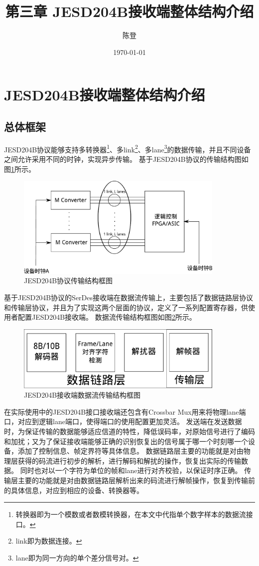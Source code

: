 \documentclass[UTF8]{ctexart}
\title{第三章 JESD204B接收端整体结构介绍}
\author{陈登}
\date{\today}
\begin{document}
\section{JESD204B接收端整体结构介绍}

\subsection{总体框架}

JESD204B协议能够支持多转换器\footnote{转换器即为一个模数或者数模转换器，在本文中代指单个数字样本的数据流接口。}、多link\footnote{link即为数据连接。}、多lane\footnote{lane即为同一方向的单个差分信号对。}的数据传输，并且不同设备之间允许采用不同的时钟，实现异步传输。
基于JESD204B协议的传输结构图如图\ref{fig:jesd204b_stuct}所示。

\begin{figure}[H]
\centering
\includegraphics[width=10cm]{./img/jesd204b_stuct.pdf}
\caption{JESD204B协议传输结构框图}
\label{fig:jesd204b_stuct}
\end{figure}

基于JESD204B协议的SerDes接收端在数据流传输上，主要包括了数据链路层协议和传输层协议，并且为了实现这两个层面的协议，定义了一系列配置寄存器，供使用者配置JESD204B接收端。
数据流传输结构框图如图\ref{fig:serdes_sturct_link_transport_layer}所示。

\begin{figure}[H]
\centering
\includegraphics[width=10cm]{./img/serdes_sturct_link_transport_layer.pdf}
\caption{JESD204B接收端数据流传输结构框图}
\label{fig:serdes_sturct_link_transport_layer}
\end{figure}

在实际使用中的JESD204B接口接收端还包含有Crossbar Mux用来将物理lane端口，对应到逻辑lane端口，使得端口的使用配置更加灵活。
发送端在发送数据时，为保证传输的数据能够适应信道的特性，降低误码率，对原始信号进行了编码和加扰；又为了保证接收端能够正确的识别恢复出的信号属于哪一个时刻哪一个设备，添加了控制信息、帧定界符等具体信息。
数据链路层主要的功能就是对由物理层获得的码流进行初步的解析，进行解码和解扰的操作，恢复出实际的传输数据。
同时也对以一个字符为单位的帧和lane进行对齐校验，以保证时序正确。
传输层主要的功能就是对由数据链路层解析出来的码流进行解帧操作，恢复到传输前的具体信息，对应到相应的设备、转换器等。
\end{document}
